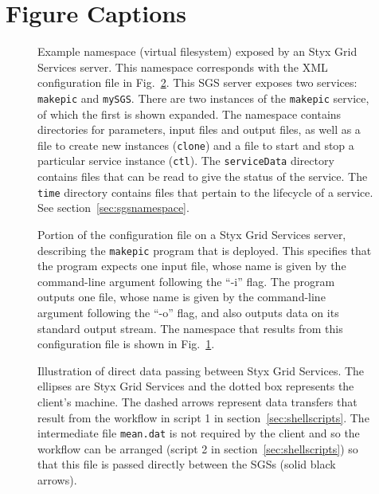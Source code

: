 \documentclass[a4paper]{article}
\begin{document}
\newpage
\singlespace

\section*{Figure Captions}

\begin{figure}[h]
\caption{Example namespace (virtual filesystem) exposed by an Styx Grid Services server.  This namespace corresponds with the XML configuration file in Fig.~\ref{fig:makepicconfig}.  This SGS server exposes two services: \texttt{makepic} and \texttt{mySGS}.  There are two instances of the \texttt{makepic} service, of which the first is shown expanded.  The namespace contains directories for parameters, input files and output files, as well as a file to create new instances (\texttt{clone}) and a file to start and stop a particular service instance (\texttt{ctl}).  The \texttt{serviceData} directory contains files that can be read to give the status of the service.  The \texttt{time} directory contains files that pertain to the lifecycle of a service.  See section~\ref{sec:sgsnamespace}.}\label{fig:sgsnamespace}
\end{figure}

\begin{figure}[h]
\caption{Portion of the configuration file on a Styx Grid Services server, describing the \texttt{makepic} program that is deployed.  This specifies that the program expects one input file, whose name is given by the command-line argument following the ``-i'' flag.  The program outputs one file, whose name is given by the command-line argument following the ``-o'' flag, and also outputs data on its standard output stream.  The namespace that results from this configuration file is shown in Fig.~\ref{fig:sgsnamespace}.}
\label{fig:makepicconfig}
\end{figure}

\begin{figure}[h]
\caption{Illustration of direct data passing between Styx Grid Services.  The ellipses are Styx Grid Services and the dotted box represents the client's machine.  The dashed arrows represent data transfers that result from the workflow in script 1 in section~\ref{sec:shellscripts}.  The intermediate file \texttt{mean.dat} is not required by the client and so the workflow can be arranged (script 2 in section~\ref{sec:shellscripts}) so that this file is passed directly between the SGSs (solid black arrows).}\label{fig:datapassing}
\end{figure}
\end{document}
